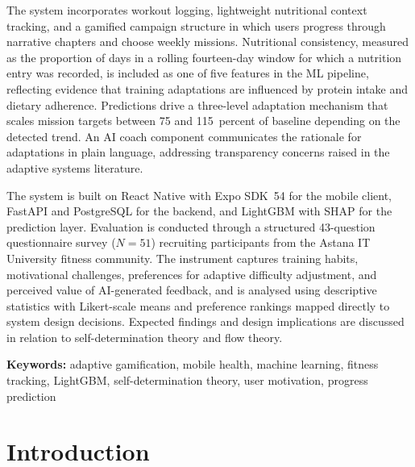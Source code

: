 \documentclass[12pt, a4paper]{report}
\begin{document}
The system incorporates workout logging, lightweight nutritional context tracking, and a gamified campaign structure in which users progress through narrative chapters and choose weekly missions. Nutritional consistency, measured as the proportion of days in a rolling fourteen-day window for which a nutrition entry was recorded, is included as one of five features in the ML pipeline, reflecting evidence that training adaptations are influenced by protein intake and dietary adherence. Predictions drive a three-level adaptation mechanism that scales mission targets between 75 and 115~percent of baseline depending on the detected trend. An AI coach component communicates the rationale for adaptations in plain language, addressing transparency concerns raised in the adaptive systems literature.

The system is built on React Native with Expo SDK~54 for the mobile client, FastAPI and PostgreSQL for the backend, and LightGBM with SHAP for the prediction layer. Evaluation is conducted through a structured 43-question questionnaire survey (\(N = 51\)) recruiting participants from the Astana IT University fitness community. The instrument captures training habits, motivational challenges, preferences for adaptive difficulty adjustment, and perceived value of AI-generated feedback, and is analysed using descriptive statistics with Likert-scale means and preference rankings mapped directly to system design decisions. Expected findings and design implications are discussed in relation to self-determination theory and flow theory.

\vspace{8pt}
\noindent\textbf{Keywords:} adaptive gamification, mobile health, machine learning, fitness tracking, LightGBM, self-determination theory, user motivation, progress prediction

\tableofcontents
\listoffigures
\listoftables

\cleardoublepage
{}

\chapter{Introduction}
\end{document}
